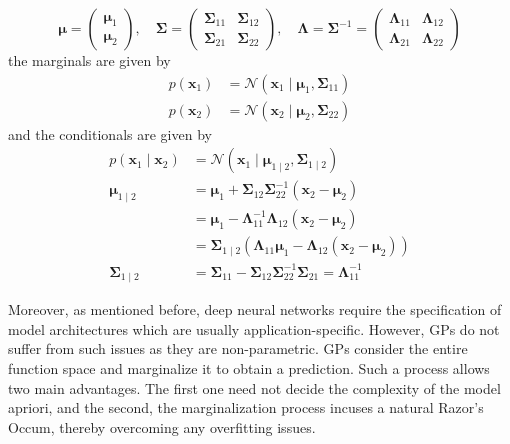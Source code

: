 \documentclass[letterpaper,11pt]{extarticle}
\begin{document}
$$
\boldsymbol{\mu}=\left(\begin{array}{l}
\boldsymbol{\mu}_{1} \\
\boldsymbol{\mu}_{2}
\end{array}\right), \quad \boldsymbol{\Sigma}=\left(\begin{array}{ll}
\boldsymbol{\Sigma}_{11} & \boldsymbol{\Sigma}_{12} \\
\boldsymbol{\Sigma}_{21} & \boldsymbol{\Sigma}_{22}
\end{array}\right), \quad \boldsymbol{\Lambda}=\boldsymbol{\Sigma}^{-1}=\left(\begin{array}{ll}
\boldsymbol{\Lambda}_{11} & \boldsymbol{\Lambda}_{12} \\
\boldsymbol{\Lambda}_{21} & \boldsymbol{\Lambda}_{22}
\end{array}\right)
$$
the marginals are given by
$$
\begin{aligned}
p\left(\mathbf{x}_{1}\right) &=\mathcal{N}\left(\mathbf{x}_{1} \mid \boldsymbol{\mu}_{1}, \boldsymbol{\Sigma}_{11}\right) \\
p\left(\mathbf{x}_{2}\right) &=\mathcal{N}\left(\mathbf{x}_{2} \mid \boldsymbol{\mu}_{2}, \mathbf{\Sigma}_{22}\right)
\end{aligned}
$$
and the conditionals are given by
$$
\begin{aligned}
p\left(\mathbf{x}_{1} \mid \mathbf{x}_{2}\right) &=\mathcal{N}\left(\mathbf{x}_{1} \mid \boldsymbol{\mu}_{1 \mid 2}, \boldsymbol{\Sigma}_{1 \mid 2}\right) \\
\boldsymbol{\mu}_{1 \mid 2} &=\boldsymbol{\mu}_{1}+\boldsymbol{\Sigma}_{12} \boldsymbol{\Sigma}_{22}^{-1}\left(\mathbf{x}_{2}-\boldsymbol{\mu}_{2}\right) \\
&=\boldsymbol{\mu}_{1}-\boldsymbol{\Lambda}_{11}^{-1} \boldsymbol{\Lambda}_{12}\left(\mathbf{x}_{2}-\boldsymbol{\mu}_{2}\right) \\
&=\boldsymbol{\Sigma}_{1 \mid 2}\left(\boldsymbol{\Lambda}_{11} \boldsymbol{\mu}_{1}-\boldsymbol{\Lambda}_{12}\left(\mathbf{x}_{2}-\boldsymbol{\mu}_{2}\right)\right) \\
\boldsymbol{\Sigma}_{1 \mid 2} &=\boldsymbol{\Sigma}_{11}-\boldsymbol{\Sigma}_{12} \boldsymbol{\Sigma}_{22}^{-1} \boldsymbol{\Sigma}_{21}=\mathbf{\Lambda}_{11}^{-1}
\end{aligned}
$$

Moreover, as mentioned before, deep neural networks require the specification of model architectures which are usually application-specific.  However, GPs do not suffer from such issues as they are non-parametric. GPs consider the entire function space and marginalize it to obtain a prediction. Such a process allows two main advantages. The first one need not decide the complexity of the model apriori, and the second, the marginalization process incuses a natural Razor's Occum, thereby overcoming any overfitting issues. 
 
\end{document}
